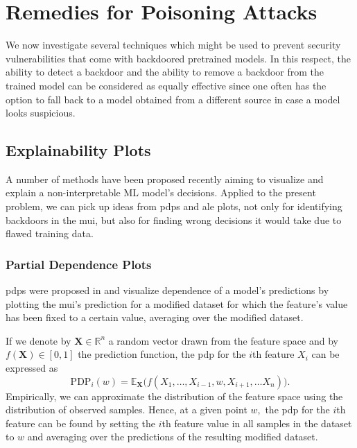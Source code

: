 \documentclass[9pt,sigconf,letterpaper,dvipsnames\ifx\removeHeaders\tempYes ,nonacm\fi]{acmart}
\begin{document}
\section{Remedies for Poisoning Attacks}
We now investigate several techniques which might be used to prevent security vulnerabilities that
come with backdoored pretrained  models. In this respect, the ability to detect a backdoor and the ability to remove a backdoor from the trained model can be considered as equally effective since one often has the option to fall back to a model obtained from a different source in case a model looks suspicious.

\subsection{Explainability Plots} \label{sec:plots}
A number of methods have been proposed recently aiming to visualize and explain a non-interpretable ML model's decisions.
Applied to the present problem, we can pick up ideas from \glspl{pdp} and \gls{ale} plots, not only for identifying backdoors in the \gls{mui}, but also for finding wrong decisions it would take due to flawed training data.

\subsubsection{Partial Dependence Plots}
\glspl{pdp} were proposed in \cite{friedman_greedy_2001} and visualize dependence of a model's predictions by plotting the \gls{mui}'s prediction for a modified dataset for which the feature's value has been fixed to a certain value, averaging over the modified dataset.

If we denote by $\boldsymbol X \in \mathbb R ^n$ a random vector drawn from the feature space and by $f(\boldsymbol X) \in [0,1]$ the  prediction function, the \gls{pdp} for the $i$th feature $X_i$ can be expressed as
\begin{equation}
\text{PDP}_i(w) = \mathbb E_{\boldsymbol X}\Big(f(X_1,\ldots,X_{i-1},w,X_{i+1},\ldots X_n)\Big) . %
\end{equation}
Empirically, we can approximate the distribution of the feature space using the distribution of observed samples. Hence, at a given point $w,$ the \gls{pdp} for the $i$th feature can be found by 
setting the $i$th feature value in all samples in the dataset to $w$
and averaging over the predictions of the resulting modified dataset.
\end{document}
